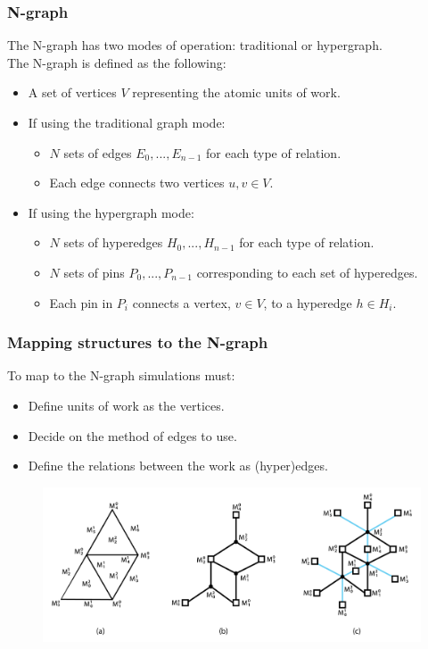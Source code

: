\documentclass{beamer}
\begin{document}
\begin{frame}
  \frametitle{N-graph}
  The N-graph has two modes of operation: traditional or hypergraph.\\
  \smallskip
  The N-graph is defined as the following:
  \begin{itemize}
  \item A set of vertices $V$ representing the atomic units of work.
  \item If using the traditional graph mode:
    \begin{itemize}
    \item $N$ sets of edges $E_0,...,E_{n-1}$ for each type of relation.
    \item Each edge connects two vertices $u,v \in V$.
    \end{itemize}
  \item If using the hypergraph mode:
    \begin{itemize}
    \item $N$ sets of hyperedges $H_0,...,H_{n-1}$ for each type of relation.
    \item $N$ sets of pins $P_0,...,P_{n-1}$ corresponding to each set of hyperedges.
    \item Each pin in $P_i$ connects a vertex, $v \in V$, to a hyperedge $h \in H_i$.
    \end{itemize}
  \end{itemize}
\end{frame}

\begin{frame}
  \frametitle{Mapping structures to the N-graph}
  To map to the N-graph simulations must:
  \begin{itemize}
  \item Define units of work as the vertices.
  \item Decide on the method of edges to use.
  \item Define the relations between the work as (hyper)edges.
  \end{itemize}
  
  \begin{figure}
    \centering
    \includegraphics[width=.7\textwidth]{figures/exampleMesh2Graph.png}
  \end{figure}
\end{frame}
\end{document}
